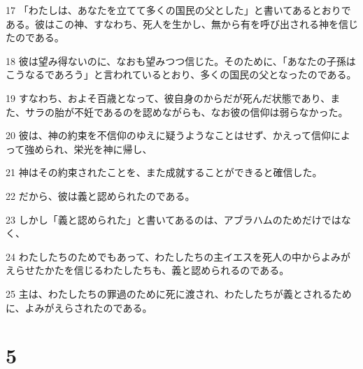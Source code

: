 \par 17 「わたしは、あなたを立てて多くの国民の父とした」と書いてあるとおりである。彼はこの神、すなわち、死人を生かし、無から有を呼び出される神を信じたのである。
\par 18 彼は望み得ないのに、なおも望みつつ信じた。そのために、「あなたの子孫はこうなるであろう」と言われているとおり、多くの国民の父となったのである。
\par 19 すなわち、およそ百歳となって、彼自身のからだが死んだ状態であり、また、サラの胎が不妊であるのを認めながらも、なお彼の信仰は弱らなかった。
\par 20 彼は、神の約束を不信仰のゆえに疑うようなことはせず、かえって信仰によって強められ、栄光を神に帰し、
\par 21 神はその約束されたことを、また成就することができると確信した。
\par 22 だから、彼は義と認められたのである。
\par 23 しかし「義と認められた」と書いてあるのは、アブラハムのためだけではなく、
\par 24 わたしたちのためでもあって、わたしたちの主イエスを死人の中からよみがえらせたかたを信じるわたしたちも、義と認められるのである。
\par 25 主は、わたしたちの罪過のために死に渡され、わたしたちが義とされるために、よみがえらされたのである。

\chapter{5}

